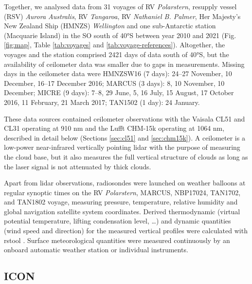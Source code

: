 \documentclass[12pt,a4paper]{article}
\begin{document}
Together, we analysed data from 31 voyages of RV \emph{Polarstern}, resupply
vessel (RSV) \emph{Aurora Australis}, RV \emph{Tangaroa}, RV \emph{Nathaniel B.
Palmer}, Her Majesty's New Zealand Ship (HMNZS) \emph{Wellington} and one
sub-Antarctic station (Macquarie Island) in the SO south of 40°S between year
2010 and 2021 (Fig. \ref{fig:map}, Table \ref{tab:voyages} and
\ref{tab:voyage-references}). Altogether, the voyages and the station comprised
2421 days of data south of 40°S, but the availability of ceilometer data was
smaller due to gaps in measurements. Missing days in the ceilometer data were
HMNZSW16 (7 days): 24--27 November, 10 December, 16--17 December 2016; MARCUS
(3 days): 8, 10 November, 10 December; MICRE (9 days): 7--8, 29 June, 5, 16
July, 15 August, 17 October 2016, 11 February, 21 March 2017; TAN1502 (1 day):
24 January.

These data sources contained ceilometer observations with the Vaisala CL51 and
CL31 operating at 910 nm and the Lufft CHM-15k operating at 1064 nm, described
in detail below (Sections \ref{sec:cl51} and \ref{sec:chm15k}). A ceilometer is
a low-power near-infrared vertically pointing lidar with the purpose of
measuring the cloud base, but it also measures the full vertical structure of
clouds as long as the laser signal is not attenuated by thick clouds.

Apart from lidar observations, radiosondes were launched on weather balloons at
regular synoptic times on the RV \emph{Polarstern}, MARCUS, NBP17024, TAN1702,
and TAN1802 voyage, measuring pressure, temperature, relative humidity and
global navigation satellite system coordinates. Derived thermodynamic (virtual
potential temperature, lifting condensation level, \ldots) and dynamic
quantities (wind speed and direction) for the measured vertical profiles were
calculated with rstool \citep{rstool}. Surface meteorological quantities were
measured continuously by an onboard automatic weather station or individual
instruments.

\subsection{ICON}
\end{document}
